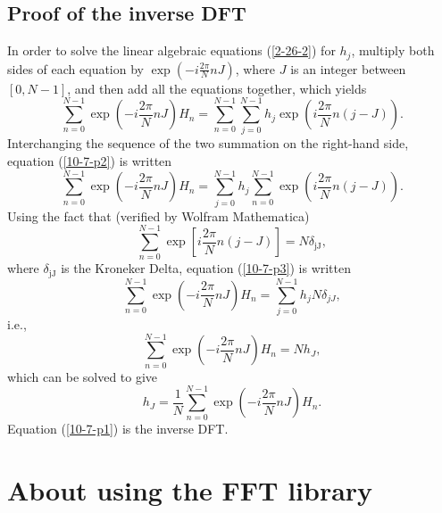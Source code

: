 \documentclass{article}
\newcommand{\tmop}[1]{\ensuremath{\operatorname{#1}}}
\begin{document}
\subsection{Proof of the inverse DFT}\label{10-7-p5}

In order to solve the linear algebraic equations (\ref{2-26-2}) for $h_j$,
multiply both sides of each equation by $\exp \left( - i \frac{2 \pi}{N} n J
\right)$, where $J$ is an integer between $[0, N - 1]$, and then add all the
equations together, which yields
\begin{equation}
  \label{10-7-p2} \sum_{n = 0}^{N - 1} \exp \left( - i \frac{2 \pi}{N} n J
  \right) H_n = \sum_{n = 0}^{N - 1} \sum_{j = 0}^{N - 1} h_j \exp \left( i
  \frac{2 \pi}{N} n (j - J) \right) .
\end{equation}
Interchanging the sequence of the two summation on the right-hand side,
equation (\ref{10-7-p2}) is written
\begin{equation}
  \label{10-7-p3} \sum_{n = 0}^{N - 1} \exp \left( - i \frac{2 \pi}{N} n J
  \right) H_n = \sum_{j = 0}^{N - 1} h_j \sum_{n = 0}^{N - 1} \exp \left( i
  \frac{2 \pi}{N} n (j - J) \right) .
\end{equation}
Using the fact that (verified by Wolfram Mathematica)
\begin{equation}
  \sum_{n = 0}^{N - 1} \exp \left[ i \frac{2 \pi}{N} n (j - J) \right] = N
  \delta_{\tmop{jJ}},
\end{equation}
where $\delta_{\tmop{jJ}}$ is the Kroneker Delta, equation (\ref{10-7-p3}) is
written
\begin{equation}
  \sum_{n = 0}^{N - 1} \exp \left( - i \frac{2 \pi}{N} n J \right) H_n =
  \sum_{j = 0}^{N - 1} h_j N \delta_{j J},
\end{equation}
i.e.,
\begin{equation}
  \sum_{n = 0}^{N - 1} \exp \left( - i \frac{2 \pi}{N} n J \right) H_n = N
  h_J,
\end{equation}
which can be solved to give
\begin{equation}
  \label{10-7-p1} h_J = \frac{1}{N} \sum_{n = 0}^{N - 1} \exp \left( - i
  \frac{2 \pi}{N} n J \right) H_n .
\end{equation}
Equation (\ref{10-7-p1}) is the inverse DFT.

\section{About using the FFT library}
\end{document}
